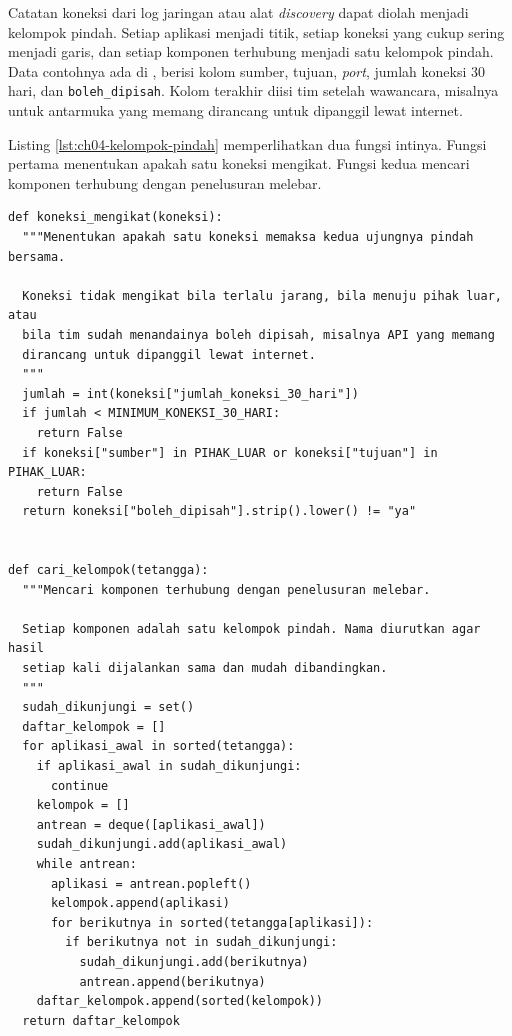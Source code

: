 \begin{pendalaman}[title={Pendalaman Teknis (opsional): Kelompok Pindah dari Log Jaringan}]
  Catatan koneksi dari log jaringan atau alat \textit{discovery} dapat diolah menjadi
  kelompok pindah. Setiap aplikasi menjadi titik, setiap koneksi yang cukup sering menjadi
  garis, dan setiap komponen terhubung menjadi satu kelompok pindah. Data contohnya ada di
  , berisi kolom sumber, tujuan,
  \textit{port}, jumlah koneksi 30 hari, dan \texttt{boleh\_dipisah}. Kolom terakhir diisi
  tim setelah wawancara, misalnya untuk antarmuka yang memang dirancang untuk dipanggil
  lewat internet.

  Listing \ref{lst:ch04-kelompok-pindah} memperlihatkan dua fungsi intinya. Fungsi pertama
  menentukan apakah satu koneksi mengikat. Fungsi kedua mencari komponen terhubung dengan
  penelusuran melebar.

\begin{lstlisting}[style=c04python, caption={Penentu koneksi yang mengikat dan pencari kelompok pindah, tersedia di \berkas{sources/chapter04/kelompok-pindah.py}}, label={lst:ch04-kelompok-pindah}]
def koneksi_mengikat(koneksi):
  """Menentukan apakah satu koneksi memaksa kedua ujungnya pindah bersama.

  Koneksi tidak mengikat bila terlalu jarang, bila menuju pihak luar, atau
  bila tim sudah menandainya boleh dipisah, misalnya API yang memang
  dirancang untuk dipanggil lewat internet.
  """
  jumlah = int(koneksi["jumlah_koneksi_30_hari"])
  if jumlah < MINIMUM_KONEKSI_30_HARI:
    return False
  if koneksi["sumber"] in PIHAK_LUAR or koneksi["tujuan"] in PIHAK_LUAR:
    return False
  return koneksi["boleh_dipisah"].strip().lower() != "ya"


def cari_kelompok(tetangga):
  """Mencari komponen terhubung dengan penelusuran melebar.

  Setiap komponen adalah satu kelompok pindah. Nama diurutkan agar hasil
  setiap kali dijalankan sama dan mudah dibandingkan.
  """
  sudah_dikunjungi = set()
  daftar_kelompok = []
  for aplikasi_awal in sorted(tetangga):
    if aplikasi_awal in sudah_dikunjungi:
      continue
    kelompok = []
    antrean = deque([aplikasi_awal])
    sudah_dikunjungi.add(aplikasi_awal)
    while antrean:
      aplikasi = antrean.popleft()
      kelompok.append(aplikasi)
      for berikutnya in sorted(tetangga[aplikasi]):
        if berikutnya not in sudah_dikunjungi:
          sudah_dikunjungi.add(berikutnya)
          antrean.append(berikutnya)
    daftar_kelompok.append(sorted(kelompok))
  return daftar_kelompok
\end{lstlisting}


\end{pendalaman}
